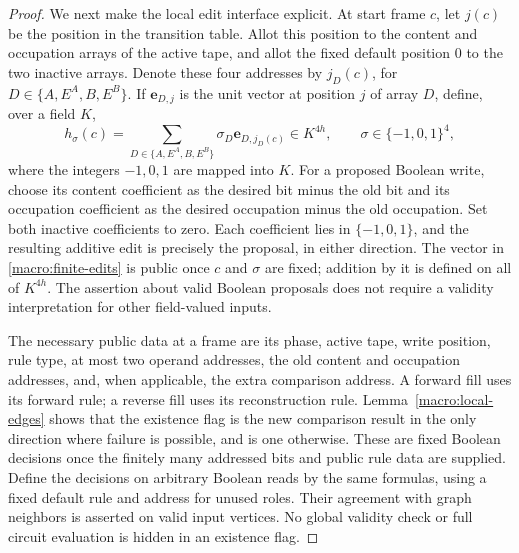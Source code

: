\begin{proof}
We next make the local edit interface explicit.  At start frame $c$,
let $j(c)$ be the position in the transition table.  Allot this
position to the content and occupation arrays of the active tape,
and allot the fixed default position $0$ to the two inactive arrays.
Denote these four addresses by $j_D(c)$, for
$D\in\{A,E^A,B,E^B\}$.  If $\mathbf e_{D,j}$ is the unit vector
at position $j$ of array $D$, define, over a field $K$,
\begin{equation}\label{macro:finite-edits}
 h_\sigma(c)=\sum_{D\in\{A,E^A,B,E^B\}}
       \sigma_D\mathbf e_{D,j_D(c)}\in K^{4h},
 \qquad \sigma\in\{-1,0,1\}^4,
\end{equation}
where the integers $-1,0,1$ are mapped into $K$.  For a proposed
Boolean write, choose its content coefficient as the desired bit
minus the old bit and its occupation coefficient as the desired
occupation minus the old occupation.  Set both inactive coefficients
to zero.  Each coefficient lies in $\{-1,0,1\}$, and the resulting
additive edit is precisely the proposal, in either direction.
The vector in \eqref{macro:finite-edits} is public once $c$ and
$\sigma$ are fixed; addition by it is defined on all of $K^{4h}$.
The assertion about valid Boolean proposals does not require a
validity interpretation for other field-valued inputs.

The necessary public data at a frame are its phase, active tape,
write position, rule type, at most two operand addresses, the old
content and occupation addresses, and, when applicable, the extra
comparison address.  A forward fill uses its forward rule; a reverse
fill uses its reconstruction rule.  Lemma~\ref{macro:local-edges}
shows that the existence flag is the new comparison result in the
only direction where failure is possible, and is one otherwise.
These are fixed Boolean decisions once the finitely many addressed
bits and public rule data are supplied.  Define the decisions on
arbitrary Boolean reads by the same formulas, using a fixed default
rule and address for unused roles.  Their agreement with graph
neighbors is asserted on valid input vertices.  No global validity
check or full circuit evaluation is hidden in an existence flag.


\end{proof}
